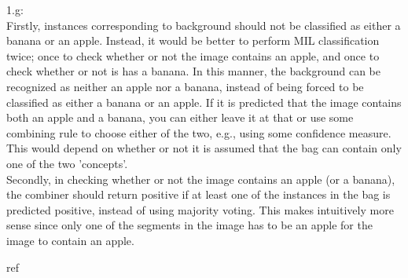 \documentclass [a4paper] {report}
\begin{document}
	1.g: \\
	
	Firstly, instances corresponding to background should not be classified as either a banana or an apple. Instead, it would be better to perform MIL classification twice; once to check whether or not the image contains an apple, and once to check whether or not is has a banana. In this manner, the background can be recognized as neither an apple nor a banana, instead of being forced to be classified as either a banana or an apple. If it is predicted that the image contains both an apple and a banana, you can either leave it at that or use some combining rule to choose either of the two, e.g., using some confidence measure. This would depend on whether or not it is assumed that the bag can contain only one of the two 'concepts'.\\
	
	Secondly, in checking whether or not the image contains an apple (or a banana), the combiner should return positive if at least one of the instances in the bag is predicted positive, instead of using majority voting. This makes intuitively more sense since only one of the segments in the image has to be an apple for the image to contain an apple.
	
	
	\begin{bibliography}{ref}
		
	\end{bibliography}
\end{document}
